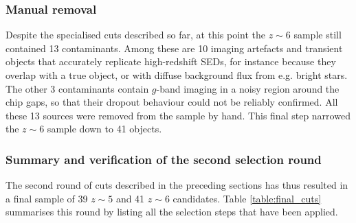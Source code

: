 \subsubsection{Manual removal}
Despite the specialised cuts described so far, at this point the $z\sim6$ sample still contained 13 contaminants. Among these are 10 imaging artefacts and transient objects that accurately replicate high-redshift SEDs, for instance because they overlap with a true object, or with diffuse background flux from e.g. bright stars. The other 3 contaminants contain $g$-band imaging in a noisy region around the chip gaps, so that their dropout behaviour could not be reliably confirmed. All these 13 sources were removed from the sample by hand. This final step narrowed the $z\sim6$ sample down to 41 objects. \par



\subsubsection{Summary and verification of the second selection round}\label{subsubsection:verification_second_round}
The second round of cuts described in the preceding sections has thus resulted in a final sample of 39 $z\sim5$ and 41 $z\sim6$ candidates. Table \ref{table:final_cuts} summarises this round by listing all the selection steps that have been applied. \par 





